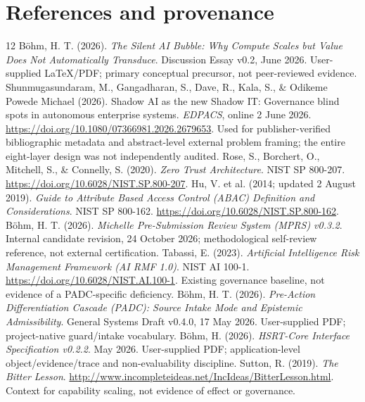 \documentclass[11pt,a4paper]{article}
\begin{document}
\section*{References and provenance}
\begin{thebibliography}{12}\footnotesize
{} B\"ohm, H. T. (2026). \emph{The Silent AI Bubble: Why Compute Scales but Value Does Not Automatically Transduce}. Discussion Essay v0.2, June 2026. User-supplied LaTeX/PDF; primary conceptual precursor, not peer-reviewed evidence.
 Shunmugasundaram, M., Gangadharan, S., Dave, R., Kala, S., \& Odikeme Powede Michael (2026). Shadow AI as the new Shadow IT: Governance blind spots in autonomous enterprise systems. \emph{EDPACS}, online 2 June 2026. \url{https://doi.org/10.1080/07366981.2026.2679653}. Used for publisher-verified bibliographic metadata and abstract-level external problem framing; the entire eight-layer design was not independently audited.
 Rose, S., Borchert, O., Mitchell, S., \& Connelly, S. (2020). \emph{Zero Trust Architecture}. NIST SP 800-207. \url{https://doi.org/10.6028/NIST.SP.800-207}.
 Hu, V. et al. (2014; updated 2 August 2019). \emph{Guide to Attribute Based Access Control (ABAC) Definition and Considerations}. NIST SP 800-162. \url{https://doi.org/10.6028/NIST.SP.800-162}.
 B\"ohm, H. T. (2026). \emph{Michelle Pre-Submission Review System (MPRS) v0.3.2}. Internal candidate revision, 24 October 2026; methodological self-review reference, not external certification.
 Tabassi, E. (2023). \emph{Artificial Intelligence Risk Management Framework (AI RMF 1.0)}. NIST AI 100-1. \url{https://doi.org/10.6028/NIST.AI.100-1}. Existing governance baseline, not evidence of a PADC-specific deficiency.
 B\"ohm, H. T. (2026). \emph{Pre-Action Differentiation Cascade (PADC): Source Intake Mode and Epistemic Admissibility}. General Systems Draft v0.4.0, 17 May 2026. User-supplied PDF; project-native guard/intake vocabulary.
 B\"ohm, H. (2026). \emph{HSRT-Core Interface Specification v0.2.2}. May 2026. User-supplied PDF; application-level object/evidence/trace and non-evaluability discipline.
 Sutton, R. (2019). \emph{The Bitter Lesson}. \url{http://www.incompleteideas.net/IncIdeas/BitterLesson.html}. Context for capability scaling, not evidence of effect or governance.
\end{thebibliography}
\end{document}

